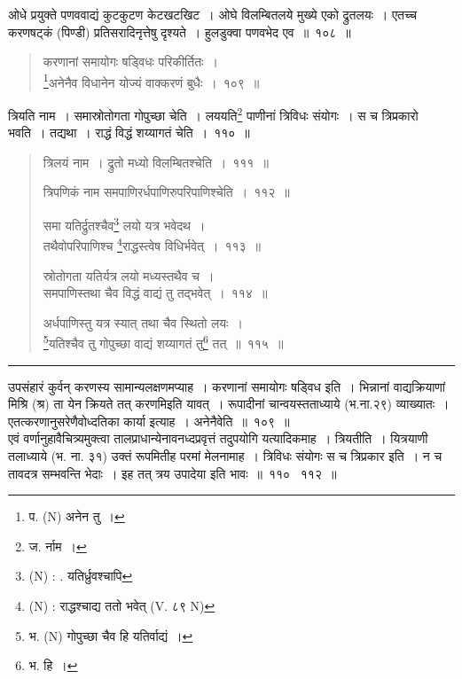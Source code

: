 \documentclass[11pt, openany]{book}
\begin{document}
ओधे प्रयुक्ते पणववाद्यं कुटकुटण केटखटखिट~। ओघे विलम्बितलये मुख्ये एको द्रुतलयः~। एतच्च करणषट्कं (पिण्डी) प्रतिसरादिनृत्तेषु दृश्यते~। हुलडुक्वा पणवभेद एव~॥~१०८~॥

\newpage

\begin{quote}
{\na करणानां समायोगः षड्विधः परिकीर्तितः~।\\
\renewcommand{\thefootnote}{1}\footnote{प. (N) अनेन तु~।}अनेनैव विधानेन योज्यं वाक्करणं बुधैः~।~१०९~॥}
\end{quote}

{\qt त्रियति नाम~। समास्रोतोगता गोपुच्छा चेति~। लययति\renewcommand{\thefootnote}{2}\footnote{ज. र्नाम~।} पाणीनां त्रिविधः संयोगः~। स च त्रिप्रकारो भवति~। तद्यथा~। राद्धं विद्धं शय्यागतं चेति~।~११०~॥}

\begin{quote}
{\na त्रिलयं नाम~। द्रुतो मध्यो विलम्बितश्चेति~।~१११~॥

त्रिपणिकं नाम समपाणिरर्धपाणिरुपरिपाणिश्चेति~।~११२~॥ 

समा यतिर्द्रुतश्चैव\renewcommand{\thefootnote}{2a}\footnote{(N) : . यतिर्ध्रुवश्चापि} लयो यत्र भवेदथ~।\\
तथैवोपरिपाणिश्च \renewcommand{\thefootnote}{2b}\footnote{(N) : राद्धश्चाद्य ततो भवेत् (V. ८९ N)}राद्धस्त्वेष विधिर्भवेत्~।~११३~॥

स्रोतोगता यतिर्यत्र लयो मध्यस्तथैव च~।\\
समपाणिस्तथा चैव विद्धं वाद्यं तु तद्भवेत्~।~११४~॥

अर्धपाणिस्तु यत्र स्यात् तथा चैव स्थितो लयः~।\\
\renewcommand{\thefootnote}{3}\footnote{भ. (N) गोपुच्छा चैव हि यतिर्वाद्यं~।}यतिश्चैव तु गोपुच्छा वाद्यं शय्यागतं तु\renewcommand{\thefootnote}{4}\footnote{भ. हि~।} तत्~॥~११५~॥}
\end{quote}

\hrule

\vspace{2mm}
उपसंहारं कुर्वन् करणस्य सामान्यलक्षणमप्याह~। करणानां समायोगः षड्विध इति~। भिन्नानां वाद्यक्रियाणां मिश्रि (श्र) ता येन क्रियते तत् करणमिइति यावत्~। रूपादीनां चान्वयस्तताध्याये  (भ.ना.२९) व्याख्यातः~।एतत्करणानुसरेणैवोध्दतिका कार्या इत्याह~। {\qtt अनेनैवेति}~॥~१०९~॥\\

एवं वर्णानुहावैचित्र्यमुक्त्वा तालप्राधान्येनावनध्दप्रवृत्तं तदुपयोगि यत्यादिकमाह~। {\qtt त्रियतीति}~। यित्रयाणी तलाध्याये (भ. ना. ३१) उक्तं रूपमितीह परमां मेलनामाह~। त्रिविधः संयोगः स च त्रिप्रकार इति~। न च तावदत्र सम्भवन्ति भेदाः~। इह तत् त्रय उपादेया इति भावः~॥~११० \textendash\ ११२~॥\\
\end{document}

